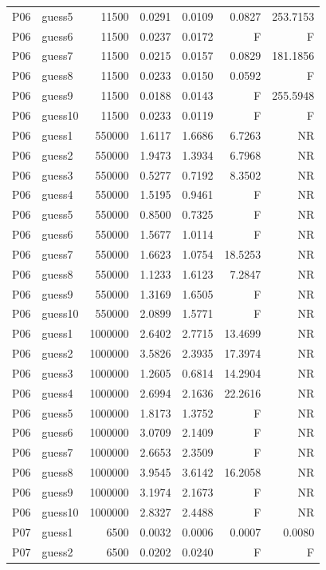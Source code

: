 {\begin{longtable}{llrrrrr}
P06 & guess5 & 11500 & 0.0291 & 0.0109 & 0.0827 & 253.7153 \\
P06 & guess6 & 11500 & 0.0237 & 0.0172 & F & F \\
P06 & guess7 & 11500 & 0.0215 & 0.0157 & 0.0829 & 181.1856 \\
P06 & guess8 & 11500 & 0.0233 & 0.0150 & 0.0592 & F \\
P06 & guess9 & 11500 & 0.0188 & 0.0143 & F & 255.5948 \\
P06 & guess10 & 11500 & 0.0233 & 0.0119 & F & F \\
P06 & guess1 & 550000 & 1.6117 & 1.6686 & 6.7263 & NR \\
P06 & guess2 & 550000 & 1.9473 & 1.3934 & 6.7968 & NR \\
P06 & guess3 & 550000 & 0.5277 & 0.7192 & 8.3502 & NR \\
P06 & guess4 & 550000 & 1.5195 & 0.9461 & F & NR \\
P06 & guess5 & 550000 & 0.8500 & 0.7325 & F & NR \\
P06 & guess6 & 550000 & 1.5677 & 1.0114 & F & NR \\
P06 & guess7 & 550000 & 1.6623 & 1.0754 & 18.5253 & NR \\
P06 & guess8 & 550000 & 1.1233 & 1.6123 & 7.2847 & NR \\
P06 & guess9 & 550000 & 1.3169 & 1.6505 & F & NR \\
P06 & guess10 & 550000 & 2.0899 & 1.5771 & F & NR \\
P06 & guess1 & 1000000 & 2.6402 & 2.7715 & 13.4699 & NR \\
P06 & guess2 & 1000000 & 3.5826 & 2.3935 & 17.3974 & NR \\
P06 & guess3 & 1000000 & 1.2605 & 0.6814 & 14.2904 & NR \\
P06 & guess4 & 1000000 & 2.6994 & 2.1636 & 22.2616 & NR \\
P06 & guess5 & 1000000 & 1.8173 & 1.3752 & F & NR \\
P06 & guess6 & 1000000 & 3.0709 & 2.1409 & F & NR \\
P06 & guess7 & 1000000 & 2.6653 & 2.3509 & F & NR \\
P06 & guess8 & 1000000 & 3.9545 & 3.6142 & 16.2058 & NR \\
P06 & guess9 & 1000000 & 3.1974 & 2.1673 & F & NR \\
P06 & guess10 & 1000000 & 2.8327 & 2.4488 & F & NR \\
P07 & guess1 & 6500 & 0.0032 & 0.0006 & 0.0007 & 0.0080 \\
P07 & guess2 & 6500 & 0.0202 & 0.0240 & F & F \\

\end{longtable}}
